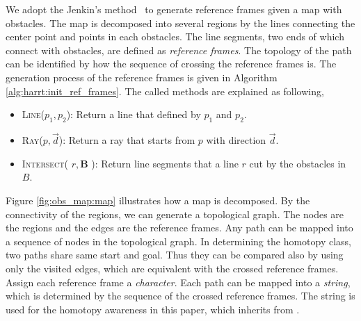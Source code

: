 \documentclass[letterpaper, 10 pt, conference]{ieeeconf}
\begin{document}
We adopt the Jenkin's method~\cite{Hernandez201544} to generate reference frames given a map with obstacles.
The map is decomposed into several regions by the lines connecting the center point and points in each obstacles.
The line segments, two ends of which connect with obstacles, are defined as \emph{reference frames}.
The topology of the path can be identified by how the sequence of crossing the reference frames is.
The generation process of the reference frames is given in Algorithm \ref{alg:harrt:init_ref_frames}.
The called methods are explained as following,
\begin{itemize}
	\item \textsc{Line}($ p_{1}, p_{2} $):
	Return a line that defined by $ p_{1} $ and $ p_{2} $.
	\item \textsc{Ray}($ p, \vec{d} $):
	Return a ray that starts from $ p $ with direction $ \vec{d}  $.
	\item \textsc{Intersect}( $ r , \bm{B} $ ):
	Return line segments that a line $ r $ cut by the obstacles in $ B $.
\end{itemize}

Figure \ref{fig:obs_map:map} illustrates how a map is decomposed.
By the connectivity of the regions, we can generate a topological graph.
The nodes are the regions and the edges are the reference frames.
Any path can be mapped into a sequence of nodes in the topological graph.
In determining the homotopy class, two paths share same start and goal.
Thus they can be compared also by using only the visited edges, which are equivalent with the crossed reference frames.
Assign each reference frame a {\em character}.
Each path can be mapped into a {\em string}, which is determined by the sequence of the crossed reference frames.
The string is used for the homotopy awareness in this paper, which inherits from \cite{Hernandez201544}.
\end{document}
